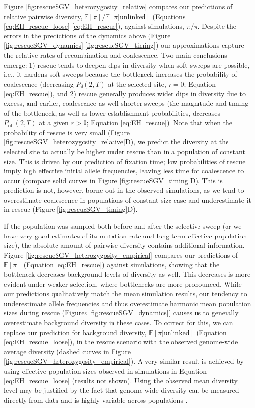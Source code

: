 \documentclass[]{article}
\begin{document}
Figure \ref{fig:rescueSGV_heterozygosity_relative} compares our predictions of relative pairwise diversity, $\mathbb{E}[\pi]/\mathbb{E}[\pi|\mathrm{unlinked}]$ (Equations \ref{eq:EH_rescue_loose}-\ref{eq:EH_rescue}), against simulations, $\pi/\overline{\pi}$.
Despite the errors in the predictions of the dynamics above (Figure \ref{fig:rescueSGV_dynamics}-\ref{fig:rescueSGV_timing}) our approximations capture the relative rates of recombination and coalescence.
Two main conclusions emerge:
1) rescue tends to deepen dips in diversity when soft sweeps are possible, i.e., it hardens soft sweeps because the bottleneck increases the probability of coalescence (decreasing $P_\emptyset(2,T)$ at the selected site, $r=0$; Equation \ref{eq:EH_rescue}), and
2) rescue generally produces wider dips in diversity due to excess, and earlier, coalescence as well shorter sweeps (the magnitude and timing of the bottleneck, as well as lower establishment probabilities, decreases $P_\mathrm{off}(2,T)$ at a given $r>0$; Equation \ref{eq:EH_rescue}).
Note that when the probability of rescue is very small (Figure \ref{fig:rescueSGV_heterozygosity_relative}D), we predict the diversity at the selected site to actually be higher under rescue than in a population of constant size.
This is driven by our prediction of fixation time; low probabilities of rescue imply high effective initial allele frequencies, leaving less time for coalescence to occur (compare solid curves in Figure \ref{fig:rescueSGV_timing}D).
This is prediction is not, however, borne out in the observed simulations, as we tend to overestimate coalescence in populations of constant size case and underestimate it in rescue (Figure \ref{fig:rescueSGV_timing}D).

If the population was sampled both before and after the selective sweep (or we have very good estimates of its mutation rate and long-term effective population size), the absolute amount of pairwise diversity contains additional information.
Figure \ref{fig:rescueSGV_heterozygosity_empirical} compares our predictions of $\mathbb{E}[\pi]$ (Equation \ref{eq:EH_rescue}) against simulations, showing that the bottleneck decreases background levels of diversity as well. 
This decreases is more evident under weaker selection, where bottlenecks are more pronounced.
While our predictions qualitatively match the mean simulation results, our tendency to underestimate allele frequencies and thus overestimate harmonic mean population sizes during rescue (Figures \ref{fig:rescueSGV_dynamics}) causes us to generally overestimate background diversity in these cases.
To correct for this, we can replace our prediction for background diversity, $\mathbb{E}[\pi | \mathrm{unlinked}]$ (Equation \ref{eq:EH_rescue_loose}), in the rescue scenario with the observed genome-wide average diversity (dashed curves in Figure \ref{fig:rescueSGV_heterozygosity_empirical}).
A very similar result is achieved by using effective population sizes observed in simulations in Equation \ref{eq:EH_rescue_loose} (results not shown). 
Using the observed mean diversity level may be justified by the fact that genome-wide diversity can be measured directly from data and is highly variable across populations \citep{tajima1983evolutionary}.
\end{document}

